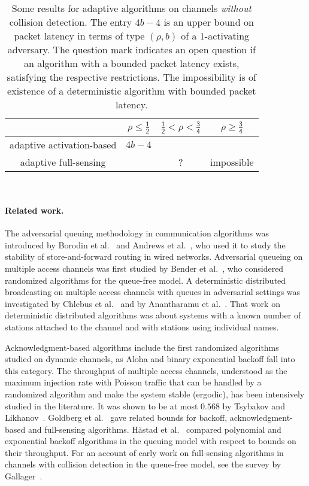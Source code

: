 \documentclass[11pt]{article}
\newcommand{\BBB}{\vspace*{-\bigskipamount}}
\newcommand{\Paragraph}[1]{\BBB\paragraph{#1}}
\newlength{\pagewidth}
\newcommand{\RB}{\raisebox{2.5ex}{~}}
\newcommand{\LB}{\raisebox{-1.5ex}{~}}
\begin{document}
\begin{table}
\begin{center}
\begin{tabular}{|c ||c |c |c |}
\hline
\RB \LB
& $\mathsf{\rho \le \frac{1}{2}}$ 
&$\mathsf{\frac{1}{2}<\rho < \frac{3}{4}}$&$\mathsf{\rho \ge \frac{3}{4}}$\\
\hline\hline
\RB \LB
\textsf{adaptive activation-based }  &$4b-4$&& \\
\hline
\RB \LB
\textsf{adaptive full-sensing }  &&?& impossible\\
\hline
\end{tabular}
\parbox{\pagewidth}{
~
\caption{\label{tab:no-collision-detection}
Some results for adaptive algorithms on channels \emph{without} collision detection.
The entry $4b-4$ is an upper bound on packet latency in terms of type $(\rho,b)$ of a $1$-activating adversary.
The question mark indicates an open question if an algorithm with a bounded packet latency exists,  satisfying the respective restrictions.
The impossibility is of existence of a deterministic algorithm with bounded packet latency.
}}
\end{center}
\end{table}



\Paragraph{Related work.}



The adversarial queuing methodology in communication algorithms was introduced by Borodin et al.~\cite{BorodinKRSW-JACM01} and Andrews et al.~\cite{AndrewsAFLLK-JACM01}, who  used it to study the stability of store-and-forward routing in wired networks.
Adversarial queueing on multiple access channels was first studied by Bender et al.~\cite{BenderFHKL05}, who considered  randomized algorithms for the queue-free model.
A deterministic distributed broadcasting on multiple access channels with queues in adversarial settings was investigated by Chlebus et al.~\cite{ChlebusKR09,ChlebusKR-TALG12} and by Anantharamu et al.~\cite{AnantharamuCKR-INFOCOM10, AnantharamuCKR-SIROCCO11, AnantharamuCR-OPODIS09}.
That work on deterministic distributed algorithms was about systems with a known number of stations attached to the channel and with stations using individual names.


Acknowledgment-based algorithms include the first randomized algorithms studied on dynamic channels, as Aloha and binary exponential backoff fall into this category.
The throughput of multiple access channels, understood as the maximum injection rate with Poisson traffic that can be handled by a randomized algorithm and make the system stable (ergodic), has been intensively studied in the literature.
It was shown to be at most $0.568$ by Tsybakov and Likhanov~\cite{TsybakovL87}. 
Goldberg et al.~\cite{GoldbergJKP04} gave related bounds for backoff, acknowledgment-based and full-sensing algorithms.
H{\aa }stad et al.~\cite{HastadLR-SICOMP96} compared polynomial and exponential backoff algorithms in the queuing model with respect to bounds on their throughput.
For an  account of early work on full-sensing algorithms in channels with collision detection in the queue-free model, see the survey by Gallager~\cite{Gallager-TIT85}.
\end{document}
